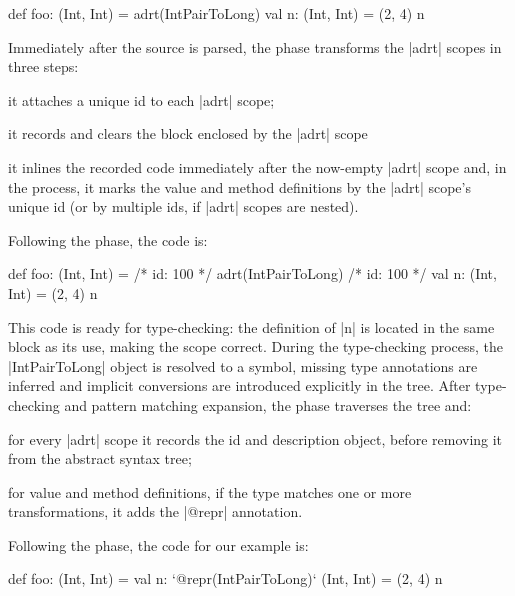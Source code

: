 \begin{lstlisting-nobreak}
def foo: (Int, Int) = {
  adrt(IntPairToLong) {
    val n: (Int, Int) = (2, 4)
  }
  n
}
\end{lstlisting-nobreak}

\noindent
Immediately after the source is parsed, the \postparser{} phase transforms the |adrt| scopes in three steps:
\begin{compactitem}
\item it attaches a unique id to each |adrt| scope;
\item it records and clears the block enclosed by the |adrt| scope
\item it inlines the recorded code immediately after the now-empty
|adrt| scope and, in the process, it marks the value and method definitions
by the |adrt| scope's unique id (or by multiple ids, if |adrt| scopes are nested).
\end{compactitem}
\noindent Following the \postparser{} phase, the code is:

\begin{lstlisting-nobreak}
def foo: (Int, Int) = {
  /* id: 100 */ adrt(IntPairToLong) {}
  /* id: 100 */ val n: (Int, Int) = (2, 4)
  n
}
\end{lstlisting-nobreak}

This code is ready for type-checking: the definition of |n| is located in the same block as its use, making the scope correct. During the type-checking process, the |IntPairToLong| object is resolved to a symbol, missing type annotations are inferred and implicit conversions are introduced explicitly in the tree. After type-checking and pattern matching expansion, the \inject{} phase traverses the tree and: %

\begin{compactitem}
\item for every |adrt| scope it records the id and description object, before removing it from the abstract syntax tree;
\item for value and method definitions, if the type matches one or more transformations, it adds the |@repr| annotation.
\end{compactitem}
\noindent Following the \inject{} phase, the code for our example is:

\begin{lstlisting-nobreak}
def foo: (Int, Int) = {
  val n: `@repr(IntPairToLong)` (Int, Int) = (2, 4)
  n
}
\end{lstlisting-nobreak}

